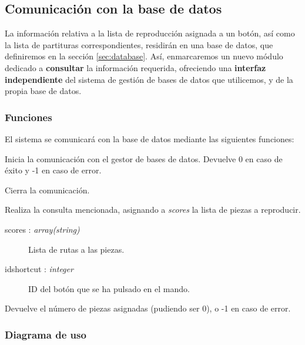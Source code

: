 \smallskip

\subsection{Comunicación con la base de datos}

La información relativa a la lista de reproducción asignada a un botón, así como la lista de partituras correspondientes, residirán en una base de datos, que definiremos en la sección \ref{sec:database}. Así, enmarcaremos un nuevo módulo dedicado a \textbf{consultar} la información requerida, ofreciendo una \textbf{interfaz independiente} del sistema de gestión de bases de datos que utilicemos, y de la propia base de datos.

\subsubsection{Funciones}

El sistema se comunicará con la base de datos mediante las siguientes funciones:

\begin{description}[style=nextline]
	\item[db\_init () : \textit{integer}]
	Inicia la comunicación con el gestor de bases de datos. Devuelve 0 en caso de éxito y -1 en caso de error.
	
	\item[db\_destroy ()]
	Cierra la comunicación.
	
	\item[db\_query (scores, idshortcut) : \textit{integer}]
	Realiza la consulta mencionada, asignando a \textit{scores} la lista de piezas a reproducir.
	
	\begin{description}
		\item[scores : \textit{array(string)}] Lista de rutas a las piezas.
		\item[idshortcut : \textit{integer}] ID del botón que se ha pulsado en el mando.
	\end{description}
	
	Devuelve el número de piezas asignadas (pudiendo ser 0), o -1 en caso de error.
	
\end{description}

\subsubsection{Diagrama de uso}

